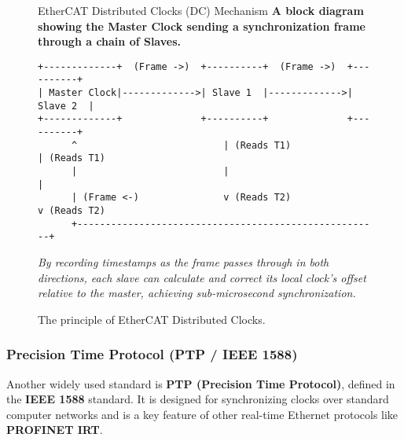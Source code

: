 \begin{figure}[htbp!] %
    \centering
    \begin{infobox}{EtherCAT Distributed Clocks (DC) Mechanism}
        \textbf{A block diagram showing the Master Clock sending a synchronization frame through a chain of Slaves.}
        \begin{lstlisting}[language=Text, basicstyle=\ttfamily\scriptsize, columns=fixed, frame=none, numbers=none, showstringspaces=false, breaklines=false, breakatwhitespace=false, aboveskip=0pt, belowskip=0pt]
+-------------+  (Frame ->)  +----------+  (Frame ->)  +----------+
| Master Clock|------------->| Slave 1  |------------->| Slave 2  |
+-------------+              +----------+              +----------+
      ^                          | (Reads T1)                | (Reads T1)
      |                          |                           |
      | (Frame <-)               v (Reads T2)                v (Reads T2)
      +------------------------------------------------------+
        \end{lstlisting}
        \vspace{0.2cm}
        \textit{By recording timestamps as the frame passes through in both directions, each slave can calculate and correct its local clock's offset relative to the master, achieving sub-microsecond synchronization.}
    \end{infobox}
    \caption{The principle of EtherCAT Distributed Clocks.}
    \label{fig:ethercat_dc}
\end{figure}

\subsubsection{Precision Time Protocol (PTP / IEEE 1588)}
\label{subsubsec:ptp}

Another widely used standard is \textbf{PTP (Precision Time Protocol)}, defined in the \textbf{IEEE 1588} standard. It is designed for synchronizing clocks over standard computer networks and is a key feature of other real-time Ethernet protocols like \textbf{PROFINET IRT}.

